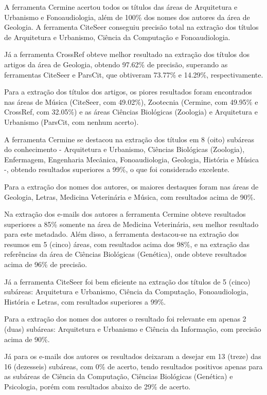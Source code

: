 A ferramenta Cermine acertou todos os títulos das áreas de Arquitetura e Urbanismo e Fonoaudiologia, além de 100\% dos nomes dos autores da área de Geologia. A ferramenta CiteSeer conseguiu precisão total na extração dos títulos de Arquitetura e Urbanismo, Ciência da Computação e Fonoaudiologia. 

Já a ferramenta CrossRef obteve melhor resultado na extração dos títulos dos artigos da área de Geologia, obtendo 97.62\% de precisão, superando as ferramentas CiteSeer e ParsCit, que obtiveram 73.77\% e 14.29\%, respectivamente.

Para a extração dos títulos dos artigos, os piores resultados foram encontrados nas áreas de Música (CiteSeer, com 49.02\%), Zootecnia (Cermine, com 49.95\% e CrossRef, com 32.05\%) e as áreas Ciências Biológicas (Zoologia) e Arquitetura e Urbanismo (ParsCit, com nenhum acerto).

A ferramenta Cermine se destacou na extração dos títulos em 8 (oito) subáreas do conhecimento - Arquitetura e Urbanismo, Ciências Biológicas (Zoologia), Enfermagem, Engenharia Mecânica, Fonoaudiologia, Geologia, História e Música -, obtendo resultados superiores a 99\%, o que foi considerado excelente. 

Para a extração dos nomes dos autores, os maiores destaques foram nas áreas de Geologia, Letras, Medicina Veterinária e Música, com resultados acima de 90\%. 

Na extração dos e-mails dos autores a ferramenta Cermine obteve resultados superiores a 85\% somente na área de Medicina Veterinária, seu melhor resultado para este metadado. Além disso, a ferramenta destacou-se na extração dos resumos em 5 (cinco) áreas, com resultados acima dos 98\%, e na extração das referências da área de Ciências Biológicas (Genética), onde obteve resultados acima de 96\% de precisão.

Já a ferramenta CiteSeer foi bem eficiente na extração dos títulos de 5 (cinco) subáreas: Arquitetura e Urbanismo, Ciência da Computação, Fonoaudiologia, História e Letras, com resultados superiores a 99\%. 

Para a extração dos nomes dos autores o resultado foi relevante em apenas 2 (duas) subáreas: Arquitetura e Urbanismo e Ciência da Informação, com precisão acima de 90\%. 

Já para os e-mails dos autores os resultados deixaram a desejar em 13 (treze) das 16 (dezesseis) subáreas, com 0\% de acerto, tendo resultados positivos apenas para as subáreas de Ciência da Computação, Ciências Biológicas (Genética) e Psicologia, porém com resultados abaixo de 29\% de acerto.

